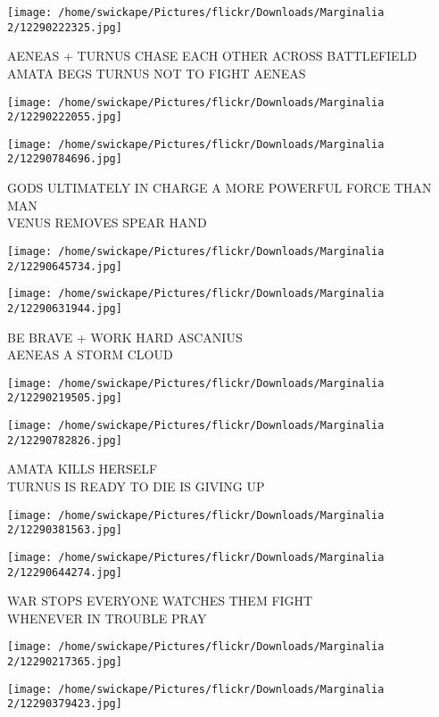 \documentclass[10pt,letterpaper]{article}
\begin{document}
\vspace{0.25in}
\texttt{[image: /home/swickape/Pictures/flickr/Downloads/Marginalia 2/12290222325.jpg]}

AENEAS + TURNUS CHASE EACH OTHER ACROSS BATTLEFIELD\\
AMATA BEGS TURNUS NOT TO FIGHT AENEAS
\pagebreak

\texttt{[image: /home/swickape/Pictures/flickr/Downloads/Marginalia 2/12290222055.jpg]}

\vspace{0.25in}
\texttt{[image: /home/swickape/Pictures/flickr/Downloads/Marginalia 2/12290784696.jpg]}

GODS ULTIMATELY IN CHARGE A MORE POWERFUL FORCE THAN MAN\\
VENUS REMOVES SPEAR HAND
\pagebreak

\texttt{[image: /home/swickape/Pictures/flickr/Downloads/Marginalia 2/12290645734.jpg]}

\vspace{0.25in}
\texttt{[image: /home/swickape/Pictures/flickr/Downloads/Marginalia 2/12290631944.jpg]}

BE BRAVE + WORK HARD ASCANIUS\\
AENEAS A STORM CLOUD
\pagebreak

\texttt{[image: /home/swickape/Pictures/flickr/Downloads/Marginalia 2/12290219505.jpg]}

\vspace{0.25in}
\texttt{[image: /home/swickape/Pictures/flickr/Downloads/Marginalia 2/12290782826.jpg]}

AMATA KILLS HERSELF\\
TURNUS IS READY TO DIE IS GIVING UP
\pagebreak

\texttt{[image: /home/swickape/Pictures/flickr/Downloads/Marginalia 2/12290381563.jpg]}

\vspace{0.25in}
\texttt{[image: /home/swickape/Pictures/flickr/Downloads/Marginalia 2/12290644274.jpg]}

WAR STOPS EVERYONE WATCHES THEM FIGHT\\
WHENEVER IN TROUBLE PRAY
\pagebreak

\texttt{[image: /home/swickape/Pictures/flickr/Downloads/Marginalia 2/12290217365.jpg]}

\vspace{0.25in}
\texttt{[image: /home/swickape/Pictures/flickr/Downloads/Marginalia 2/12290379423.jpg]}
\end{document}
